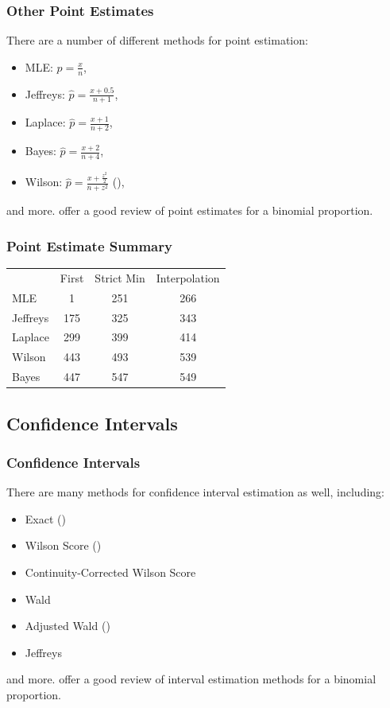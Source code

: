 \documentclass{beamer}\usepackage{knitr}
\begin{document}
\begin{frame}
  \frametitle{Other Point Estimates}
  
  There are a number of different methods for point estimation:
  \begin{itemize}
    \item MLE: $\hat{p} = \frac{x}{n}$,
    \item Jeffreys: $\hat{p} = \frac{x + 0.5}{n + 1}$,
    \item Laplace: $\hat{p} = \frac{x + 1}{n + 2}$,
    \item Bayes: $\hat{p} = \frac{x + 2}{n + 4}$,
    \item Wilson: $\hat{p} = \frac{x + \frac{z^2}{2}}{n + z^2}$ (\cite{Wilson1927}),
  \end{itemize}
  and more. \cite{Chew1971} offer a good review of point estimates for a binomial proportion.
  
\end{frame}



\begin{frame}[fragile]
\frametitle{Point Estimate Summary}
\begin{center}
  \begin{tabular}{lccc}
              & First & Strict Min & Interpolation \\
    MLE       & 1 & 251 & 266 \\
    Jeffreys  & 175 & 325 & 343 \\
    Laplace   & 299 & 399 & 414 \\
    Wilson    & 443 & 493 & 539 \\
    Bayes     & 447 & 547 & 549 \\
  \end{tabular}
\end{center}
\end{frame}


\subsection{Confidence Intervals}

\begin{frame}
  \frametitle{Confidence Intervals}
  
  There are many methods for confidence interval estimation as well, including:
  \begin{itemize}
    \item Exact (\cite{Clopper1934})
    \item Wilson Score (\cite{Wilson1927})
    \item Continuity-Corrected Wilson Score
    \item Wald
    \item Adjusted Wald (\cite{Agresti1998})
    \item Jeffreys
  \end{itemize}
  and more. \cite{Agresti1998} offer a good review of interval estimation methods for a binomial proportion.
  
\end{frame}
\end{document}
